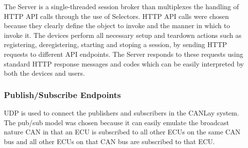 \documentclass[letterpaper,twocolumn,10pt]{article}
\begin{document}
The Server is a single-threaded session broker than multiplexes the handling of HTTP API calls through the use of Selectors. HTTP API calls were chosen because they clearly define the object to invoke and the manner in which to invoke it. The devices perform all necessary setup and teardown actions such as registering, deregistering, starting and stoping a session, by sending HTTP requests to different API endpoints. The Server responds to these requests using standard HTTP response messages and codes which can be easily interpreted by both the devices and users.




\subsubsection{Publish/Subscribe Endpoints}
UDP is used to connect the publishers and subscribers in the CANLay system. 
The pub/sub model was chosen because it can easily emulate the broadcast nature CAN \cite{kaiser_implementing_1999} in that an ECU is subscribed to all other ECUs on the same CAN bus and all other ECUs on that CAN bus are subscribed to that ECU. 
\end{document}
